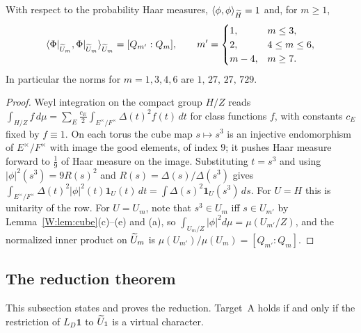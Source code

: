 \begin{lemma}\label{W:lem:norm}
With respect to the probability Haar measures,
$\langle\phi,\phi\rangle_{\widetilde H}=1$ and, for $m\ge1$,
\[
 \langle\Phi|_{\widetilde U_m},\Phi|_{\widetilde U_m}\rangle_{\widetilde U_m}=[Q_{m'}:Q_m],\qquad
 m'=\begin{cases}1,&m\le3,\\2,&4\le m\le6,\\m-4,&m\ge7.\end{cases}
\]
In particular the norms for $m=1,3,4,6$ are $1,\,27,\,27,\,729$.
\end{lemma}
\begin{proof}
Weyl integration on the compact group $H/Z$ reads
$\int_{H/Z}f\,d\mu=\sum_E\tfrac{c_E}{2}\int_{E^\times/F^\times}\Delta(t)^2f(t)\,dt$
for class functions $f$, with constants $c_E$ fixed by $f\equiv1$.
On each torus the cube map $s\mapsto s^3$ is an injective endomorphism
of $E^\times/F^\times$ with image the good elements, of index $9$; it
pushes Haar measure forward to $\tfrac19$ of Haar measure on the image.
Substituting $t=s^3$ and using $|\phi|^2(s^3)=9R(s)^2$ and
$R(s)=\Delta(s)/\Delta(s^3)$ gives
$\int_{E^\times/F^\times}\Delta(t)^2|\phi|^2(t)\mathbf 1_{U}(t)\,dt
 =\int\Delta(s)^2\mathbf 1_{U}(s^3)\,ds$.
For $U=H$ this is unitarity of the row.  For $U=U_m$, note that
$s^3\in U_m$ iff $s\in U_{m'}$ by Lemma~\ref{W:lem:cube}(c)--(e) and (a),
so $\int_{U_m/Z}|\phi|^2d\mu=\mu(U_{m'}/Z)$, and the normalized inner
product on $\widetilde U_m$ is $\mu(U_{m'})/\mu(U_m)=[Q_{m'}:Q_m]$.
\end{proof}

\subsection{The reduction theorem}
This subsection states and proves the reduction. Target~A holds if and only if the restriction of $L_D\mathbf1$ to $\widetilde U_1$ is a virtual character.

